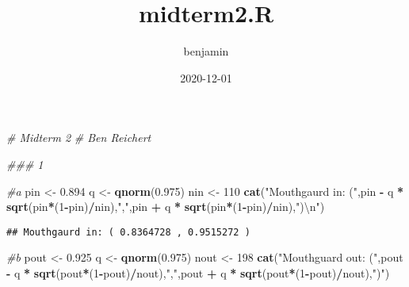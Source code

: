 \documentclass[]{article}
\title{midterm2.R}
\author{benjamin}
\date{2020-12-01}
\newenvironment{Shaded}{\begin{snugshade}}{\end{snugshade}}
\newcommand{\CharTok}[1]{\textcolor[rgb]{0.31,0.60,0.02}{#1}}
\newcommand{\CommentTok}[1]{\textcolor[rgb]{0.56,0.35,0.01}{\textit{#1}}}
\newcommand{\DecValTok}[1]{\textcolor[rgb]{0.00,0.00,0.81}{#1}}
\newcommand{\FloatTok}[1]{\textcolor[rgb]{0.00,0.00,0.81}{#1}}
\newcommand{\KeywordTok}[1]{\textcolor[rgb]{0.13,0.29,0.53}{\textbf{#1}}}
\newcommand{\NormalTok}[1]{#1}
\newcommand{\OperatorTok}[1]{\textcolor[rgb]{0.81,0.36,0.00}{\textbf{#1}}}
\newcommand{\StringTok}[1]{\textcolor[rgb]{0.31,0.60,0.02}{#1}}
\begin{document}
\maketitle

\begin{Shaded}
\begin{Highlighting}[]
\CommentTok{# Midterm 2}
\CommentTok{# Ben Reichert}

\CommentTok{### 1}

\CommentTok{#a}
\NormalTok{pin <-}\StringTok{ }\FloatTok{0.894}
\NormalTok{q <-}\StringTok{ }\KeywordTok{qnorm}\NormalTok{(}\FloatTok{0.975}\NormalTok{)}
\NormalTok{nin <-}\StringTok{ }\DecValTok{110}
\KeywordTok{cat}\NormalTok{(}\StringTok{"Mouthgaurd in: ("}\NormalTok{,pin }\OperatorTok{-}\StringTok{ }\NormalTok{q }\OperatorTok{*}\StringTok{ }\KeywordTok{sqrt}\NormalTok{(pin}\OperatorTok{*}\NormalTok{(}\DecValTok{1}\OperatorTok{-}\NormalTok{pin)}\OperatorTok{/}\NormalTok{nin),}\StringTok{","}\NormalTok{,pin }\OperatorTok{+}\StringTok{ }\NormalTok{q }\OperatorTok{*}\StringTok{ }\KeywordTok{sqrt}\NormalTok{(pin}\OperatorTok{*}\NormalTok{(}\DecValTok{1}\OperatorTok{-}\NormalTok{pin)}\OperatorTok{/}\NormalTok{nin),}\StringTok{")}\CharTok{\textbackslash{}n}\StringTok{"}\NormalTok{)}
\end{Highlighting}
\end{Shaded}

\begin{verbatim}
## Mouthgaurd in: ( 0.8364728 , 0.9515272 )
\end{verbatim}

\begin{Shaded}
\begin{Highlighting}[]
\CommentTok{#b}
\NormalTok{pout <-}\StringTok{ }\FloatTok{0.925}
\NormalTok{q <-}\StringTok{ }\KeywordTok{qnorm}\NormalTok{(}\FloatTok{0.975}\NormalTok{)}
\NormalTok{nout <-}\StringTok{ }\DecValTok{198}
\KeywordTok{cat}\NormalTok{(}\StringTok{"Mouthguard out: ("}\NormalTok{,pout }\OperatorTok{-}\StringTok{ }\NormalTok{q }\OperatorTok{*}\StringTok{ }\KeywordTok{sqrt}\NormalTok{(pout}\OperatorTok{*}\NormalTok{(}\DecValTok{1}\OperatorTok{-}\NormalTok{pout)}\OperatorTok{/}\NormalTok{nout),}\StringTok{","}\NormalTok{,pout }\OperatorTok{+}\StringTok{ }\NormalTok{q }\OperatorTok{*}\StringTok{ }\KeywordTok{sqrt}\NormalTok{(pout}\OperatorTok{*}\NormalTok{(}\DecValTok{1}\OperatorTok{-}\NormalTok{pout)}\OperatorTok{/}\NormalTok{nout),}\StringTok{")"}\NormalTok{)}
\end{Highlighting}
\end{Shaded}
\end{document}
